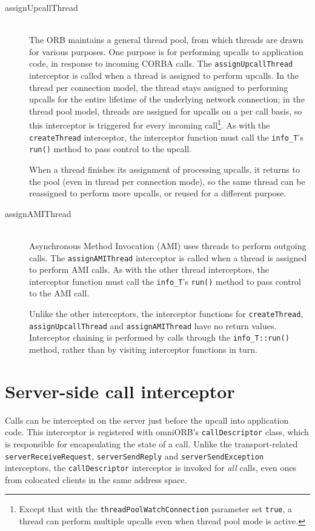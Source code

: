 \documentclass[11pt,twoside,a4paper]{book}
\newcommand{\type}[1]{\texttt{#1}}
\newcommand{\code}[1]{\texttt{#1}}
\newcommand{\op}[1]{\texttt{#1()}}
\begin{document}
\begin{description}
\item[assignUpcallThread]\mbox{}\\
%
The ORB maintains a general thread pool, from which threads are drawn
for various purposes. One purpose is for performing upcalls to
application code, in response to incoming CORBA calls. The
\code{assignUpcallThread} interceptor is called when a thread is
assigned to perform upcalls. In the thread per connection model, the
thread stays assigned to performing upcalls for the entire lifetime of
the underlying network connection; in the thread pool model, threads
are assigned for upcalls on a per call basis, so this interceptor is
triggered for every incoming call\footnote{Except that with the
  \code{threadPoolWatchConnection} parameter set \code{true}, a thread
  can perform multiple upcalls even when thread pool mode is
  active.}. As with the \code{createThread} interceptor, the
interceptor function must call the \type{info\_T}'s \op{run} method to
pass control to the upcall.

When a thread finishes its assignment of processing upcalls, it
returns to the pool (even in thread per connection mode), so the same
thread can be reassigned to perform more upcalls, or reused for a
different purpose.


\item[assignAMIThread]\mbox{}\\
%
Asynchronous Method Invocation (AMI) uses threads to perform outgoing
calls. The \code{assignAMIThread} interceptor is called when a thread
is assigned to perform AMI calls. As with the other thread
interceptors, the interceptor function must call the \type{info\_T}'s
\op{run} method to pass control to the AMI call.

Unlike the other interceptors, the interceptor functions for
\code{createThread}, \code{assignUpcallThread} and
\code{assignAMIThread} have no return values. Interceptor chaining is
performed by calls through the \op{info\_T::run} method, rather than
by visiting interceptor functions in turn.

\end{description}


\section{Server-side call interceptor}

Calls can be intercepted on the server just before the upcall into
application code. This interceptor is registered with omniORB's
\type{callDescriptor} class, which is responsible for encapsulating
the state of a call. Unlike the transport-related
\code{serverReceiveRequest}, \code{serverSendReply} and
\code{serverSendException} interceptors, the \type{callDescriptor}
interceptor is invoked for \emph{all} calls, even ones from colocated
clients in the same address space.
\end{document}
